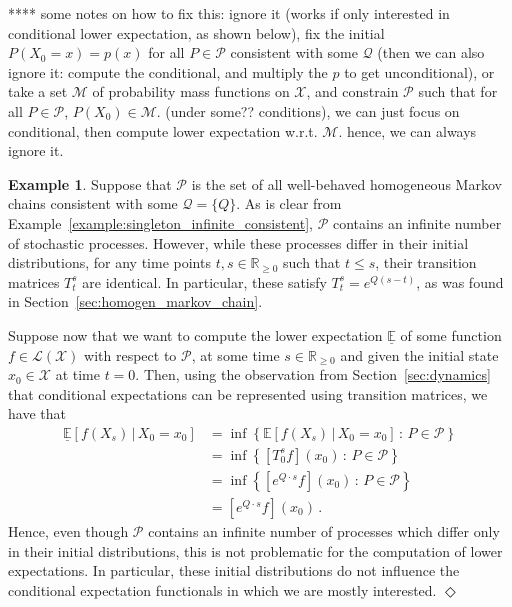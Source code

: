 \documentclass[10pt]{paper}
\theoremstyle{definition}
\newtheorem{exmp}{Example}%
\newcommand{\reals}{\mathbb{R}}
\newcommand{\realsnonneg}{\reals_{\geq 0}}
\newcommand{\states}{\mathcal{X}}
\newcommand{\gambles}{\mathcal{L}}
\newcommand{\gamblesX}{\gambles(\states)}
\newcommand{\rateset}{\mathcal{Q}}
\newcommand{\exampleend}{\hfill$\Diamond$}
\begin{document}
**** some notes on how to fix this: ignore it (works if only interested in conditional lower expectation, as shown below), fix the initial $P(X_0=x)=p(x)$ for all $P\in\mathcal{P}$ consistent with some $\rateset$ (then we can also ignore it: compute the conditional, and multiply the $p$ to get unconditional), or take a set $\mathcal{M}$ of probability mass functions on $\states$, and constrain $\mathcal{P}$ such that for all $P\in\mathcal{P}$, $P(X_0)\in\mathcal{M}$. (under some?? conditions), we can just focus on conditional, then compute lower expectation w.r.t. $\mathcal{M}$. hence, we can always ignore it.


\begin{exmp}
Suppose that $\mathcal{P}$ is the set of all well-behaved homogeneous Markov chains consistent with some $\rateset=\{Q\}$. As is clear from Example~\ref{example:singleton_infinite_consistent}, $\mathcal{P}$ contains an infinite number of stochastic processes. However, while these processes differ in their initial distributions, for any time points $t,s\in\realsnonneg$ such that $t\leq s$, their transition matrices $T_t^s$ are identical. In particular, these satisfy $T_t^s=e^{Q(s-t)}$, as was found in Section~\ref{sec:homogen_markov_chain}.

Suppose now that we want to compute the lower expectation $\underline{\mathbb{E}}$ of some function $f\in\gamblesX$ with respect to $\mathcal{P}$, at some time $s\in\realsnonneg$ and given the initial state $x_0\in\states$ at time $t=0$. Then, using the observation from Section~\ref{sec:dynamics} that conditional expectations can be represented using transition matrices, we have that
\begin{align*}
\underline{\mathbb{E}}[f(X_s)\,\vert\,X_{0}=x_0] &= \inf\left\{\mathbb{E}[f(X_s)\,\vert\,X_{0}=x_0]\,:\,P\in\mathcal{P}\right\} \\
 &= \inf\left\{ [T_0^sf](x_0) \,:\,P\in\mathcal{P}\right\} \\
 &= \inf\left\{ [e^{Q\cdot s}f](x_0)\,:\,P\in\mathcal{P}\right\} \\
 &= [e^{Q\cdot s}f](x_0)\,.
\end{align*}
Hence, even though $\mathcal{P}$ contains an infinite number of processes which differ only in their initial distributions, this is not problematic for the computation of lower expectations. In particular, these initial distributions do not influence the conditional expectation functionals in which we are mostly interested.
\exampleend
\end{exmp}
\end{document}
